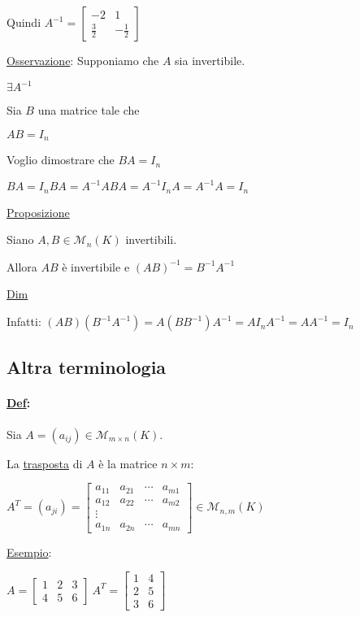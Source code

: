 \documentclass{article}
\newcommand{\ul}[1]{\underline{#1}}
\newcommand{\M}{\mathcal{M}}
\newcommand{\Def}[2]{\paragraph{\ul{Def}:}#1\\\hspace*{3em}\begin{minipage}{.8\textwidth}#2\end{minipage}}
\begin{document}
\begin{enumerate}
		      Quindi $A^{-1}=\begin{bmatrix}-2&1\\\frac{3}{2}&-\frac{1}{2}\end{bmatrix}$

		      \ul{Osservazione}: Supponiamo che $A$ sia invertibile.

		      $\exists A^{-1}$

		      Sia $B$ una matrice tale che

		      $AB=I_n$

		      Voglio dimostrare che $BA=I_n$

		      $BA=I_nBA=A^{-1}ABA=A^{-1}I_nA=A^{-1}A=I_n$
	\end{enumerate}

	\ul{Proposizione}

	Siano $A,B\in\M_n(K)$ invertibili.

	Allora $AB$ è invertibile e $(AB)^{-1}=B^{-1}A^{-1}$

	\ul{Dim}

	Infatti: $(AB)(B^{-1}A^{-1})=A(BB^{-1})A^{-1}=AI_nA^{-1}=AA^{-1}=I_n$

	\subsection{Altra terminologia}
	\Def{Sia $A=(a_{ij})\in\M_{m\times n}(K)$.}{
		La \ul{trasposta} di $A$ è la matrice $n\times m$:

		$A^T=(a_{ji})=\begin{bmatrix}
				a_{11} & a_{21} & \cdots & a_{m1} \\
				a_{12} & a_{22} & \cdots & a_{m2} \\
				\vdots                            \\
				a_{1n} & a_{2n} & \cdots & a_{mn}
			\end{bmatrix}\in\M_{n,m}(K)$

		\ul{Esempio}:

		$A=\begin{bmatrix}
				1 & 2 & 3 \\4&5&6
			\end{bmatrix}\ A^T=\begin{bmatrix}
				1 & 4 \\2&5\\3&6
			\end{bmatrix}$
	}
\end{document}
